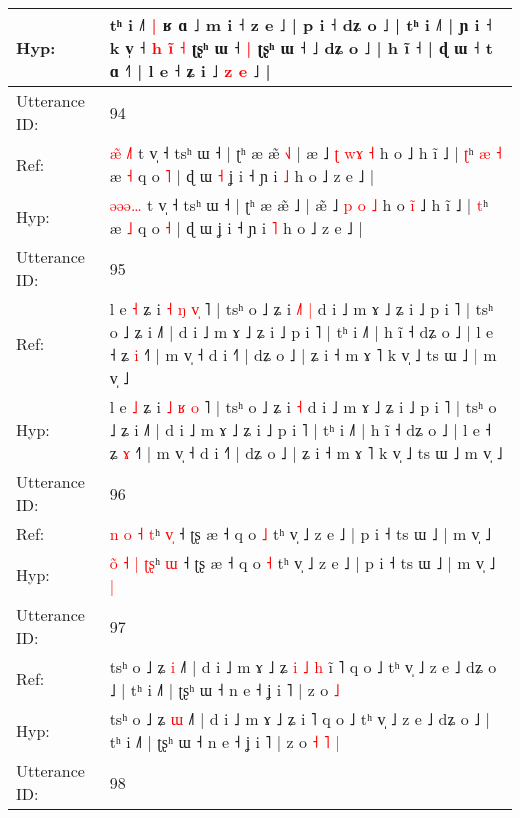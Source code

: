 \documentclass[10pt]{article}
\DeclareRobustCommand{\hl}[1]{{\textcolor{red}{#1}}}
\begin{document}
\begin{longtable}{ll}
Hyp: & tʰ i ˩˥\hl{ }\hl{|} ʁ ɑ ˩ m i ˧ z e ˩ | p i ˧ dʑ o ˩ | tʰ i ˩˥ | ɲ i ˧ k v̩ ˧\hl{ }\hl{h}\hl{ }\hl{i}\hl{̃} \hl{˧} ʈʂʰ ɯ ˧\hl{ }\hl{|} ʈʂʰ ɯ ˧\hl{}\hl{}\hl{} ˩ dʑ o ˩ | h ĩ ˧ | ɖ ɯ ˧ t ɑ ˧˥ | l e ˧ ʑ i ˩ \hl{z} \hl{e} ˩ |
 \\
\midrule
Utterance ID: & 94 \\
Ref: & \hl{æ}\hl{̃}\hl{ }\hl{˩}\hl{˥} t v̩ ˧ tsʰ ɯ ˧ | ʈʰ æ æ̃ \hl{˧}˩ | æ\hl{} ˩ \hl{ʈ} \hl{w}\hl{ɤ} \hl{˧} h o\hl{}\hl{}\hl{} ˩ h ĩ ˩ | \hl{ʈ}ʰ\hl{ }\hl{æ}\hl{ }\hl{˧} æ \hl{˧} q o \hl{˥} | ɖ ɯ\hl{ }\hl{˧} ʝ i ˧ ɲ i \hl{˩} h o ˩ z e ˩ |
 \\
Hyp: & \hl{}\hl{ə}\hl{ə}\hl{ə}\hl{…} t v̩ ˧ tsʰ ɯ ˧ | ʈʰ æ æ̃ \hl{}˩ | æ\hl{̃} ˩ \hl{p} \hl{}\hl{o} \hl{˩} h o\hl{ }\hl{i}\hl{̃} ˩ h ĩ ˩ | \hl{t}ʰ\hl{}\hl{}\hl{}\hl{} æ \hl{˩} q o \hl{˧} | ɖ ɯ\hl{}\hl{} ʝ i ˧ ɲ i \hl{˥} h o ˩ z e ˩ |
 \\
\midrule
Utterance ID: & 95 \\
Ref: & l e \hl{˧} ʑ i \hl{˧} \hl{ŋ} \hl{v}\hl{̩} ˥ | tsʰ o ˩ ʑ i\hl{ }\hl{˩}\hl{˥} \hl{|} d i ˩ m ɤ ˩ ʑ i ˩ p i ˥ | tsʰ o ˩ ʑ i ˩˥ | d i ˩ m ɤ ˩ ʑ i ˩ p i ˥ | tʰ i ˩˥ | h ĩ ˧ dʑ o ˩ | l e ˧ ʑ \hl{i} ˧˥ | m v̩ ˧ d i ˧˥ | dʑ o ˩ | ʑ i ˧ m ɤ ˥ k v̩ ˩ ts ɯ ˩\hl{ }\hl{|} m v̩ ˩
 \\
Hyp: & l e \hl{˩} ʑ i \hl{˩} \hl{ʁ} \hl{}\hl{o} ˥ | tsʰ o ˩ ʑ i\hl{}\hl{}\hl{} \hl{˧} d i ˩ m ɤ ˩ ʑ i ˩ p i ˥ | tsʰ o ˩ ʑ i ˩˥ | d i ˩ m ɤ ˩ ʑ i ˩ p i ˥ | tʰ i ˩˥ | h ĩ ˧ dʑ o ˩ | l e ˧ ʑ \hl{ɤ} ˧˥ | m v̩ ˧ d i ˧˥ | dʑ o ˩ | ʑ i ˧ m ɤ ˥ k v̩ ˩ ts ɯ ˩\hl{}\hl{} m v̩ ˩
 \\
\midrule
Utterance ID: & 96 \\
Ref: & \hl{}\hl{n} \hl{o} \hl{˧} \hl{}\hl{t}ʰ \hl{v}\hl{̩} ˧ ʈʂ æ ˧ q o \hl{˩} tʰ v̩ ˩ z e ˩ | p i ˧ ts ɯ ˩ | m v̩ ˩\hl{}\hl{}
 \\
Hyp: & \hl{o}\hl{̃} \hl{˧} \hl{|} \hl{ʈ}\hl{ʂ}ʰ \hl{}\hl{ɯ} ˧ ʈʂ æ ˧ q o \hl{˧} tʰ v̩ ˩ z e ˩ | p i ˧ ts ɯ ˩ | m v̩ ˩\hl{ }\hl{|}
 \\
\midrule
Utterance ID: & 97 \\
Ref: & tsʰ o ˩ ʑ \hl{i} ˩˥ | d i ˩ m ɤ ˩ ʑ\hl{ }\hl{i}\hl{ }\hl{˩}\hl{ }\hl{h} i\hl{̃} ˥ q o ˩ tʰ v̩ ˩ z e ˩ dʑ o ˩ | tʰ i ˩˥ | ʈʂʰ ɯ ˧ n e ˧ ʝ i ˥ | z o\hl{}\hl{}\hl{}\hl{} \hl{˩}
 \\
Hyp: & tsʰ o ˩ ʑ \hl{ɯ} ˩˥ | d i ˩ m ɤ ˩ ʑ\hl{}\hl{}\hl{}\hl{}\hl{}\hl{} i\hl{} ˥ q o ˩ tʰ v̩ ˩ z e ˩ dʑ o ˩ | tʰ i ˩˥ | ʈʂʰ ɯ ˧ n e ˧ ʝ i ˥ | z o\hl{ }\hl{˧}\hl{ }\hl{˥} \hl{|}
 \\
\midrule
Utterance ID: & 98 \\

\end{longtable}
\end{document}
